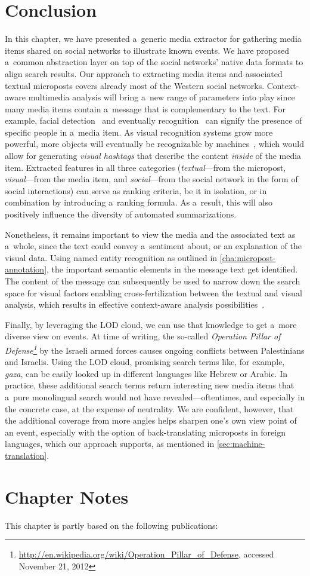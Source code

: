 \section{Conclusion}
\label{sec:conclusion}

In this chapter, we have presented a~generic media extractor
for gathering media items shared on social networks to
illustrate known events.
We have proposed a~common abstraction layer on top of the
social networks' native data formats to align search results.
Our approach to extracting media items and associated
textual microposts covers already most of
the Western social networks.
Context-aware multimedia analysis will bring a~new range of
parameters into play since many media items contain a~message
that is complementary to the text.
For example, facial detection~\cite{viola2004facedetection}
and eventually recognition~\cite{wright2009facerecognition}
can signify the presence of specific people in a~media item.
As visual recognition systems grow more powerful,
more objects will eventually be recognizable by
machines~\cite{serre2007objectrecognition},
which would allow for generating \emph{visual hashtags}
that describe the content
\emph{inside} of the media item.
Extracted features in all three categories
(\emph{textual}---from the micropost,
\emph{visual}---from the media item,
and \emph{social}---from the social network
in the form of social interactions)
can serve as ranking criteria, be it in isolation,
or in combination by introducing a~ranking formula.
As a~result, this will also positively influence
the diversity of automated summarizations.

Nonetheless, it remains important to view the media and the
associated text as a~whole, since the text
could convey a~sentiment about,
or an explanation of the visual data.
Using named entity recognition as outlined in
\autoref{cha:micropost-annotation},
the important semantic elements in the message text get identified. 
The content of the message can subsequently be used
to narrow down the search space for visual factors
enabling cross-fertilization between the textual
and visual analysis, which results in effective context-aware analysis possibilities~\cite{verborgh2012multimediaannotation}.

Finally, by leveraging the LOD cloud,
we can use that knowledge to get a~more diverse view on events.
At time of writing, the so-called
\emph{Operation Pillar of
Defense\footnote{\url{http://en.wikipedia.org/wiki/Operation_Pillar_of_Defense}, accessed November 21, 2012}}
by the Israeli armed forces
causes ongoing conflicts between Palestinians and Israelis.
Using the LOD cloud, promising search terms like, for example,
\emph{gaza}, can be easily looked up in different languages
like Hebrew or Arabic.
In practice, these additional search terms return interesting
new media items that a~pure monolingual search
would not have revealed---oftentimes,
and especially in the concrete case,
at the expense of neutrality.
We are confident, however, that the additional coverage
from more angles helps sharpen one's own view point of an event,
especially with the option of back-translating microposts
in foreign languages, which our approach supports,
as mentioned in \autoref{sec:machine-translation}.

\section*{Chapter Notes}
This chapter is partly based on the following publications:

